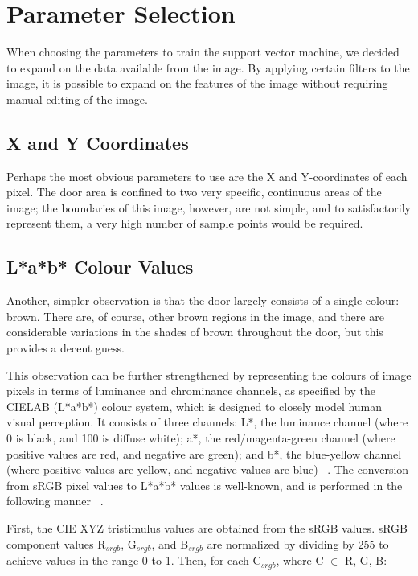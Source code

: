\chapter{Parameter Selection}

When choosing the parameters to train the support vector machine, we decided to expand on the data available from the image. By applying certain filters to the image, it is possible to expand on the features of the image without requiring manual editing of the image.

\section{X and Y Coordinates}
Perhaps the most obvious parameters to use are the X and Y-coordinates of each pixel.  The door area is confined to two very specific, continuous areas of the image; the boundaries of this image, however, are not simple, and to satisfactorily represent them, a very high number of sample points would be required.

\section{L*a*b* Colour Values}
Another, simpler observation is that the door largely consists of a single colour: brown.  There are, of course, other brown regions in the image, and there are considerable variations in the shades of brown throughout the door, but this provides a decent guess.  

This observation can be further strengthened by representing the colours of image pixels in terms of luminance and chrominance channels, as specified by the CIELAB (L*a*b*) colour system, which is designed to closely model human visual perception.  It consists of three channels: L*, the luminance channel (where 0 is black, and 100 is diffuse white); a*, the red/magenta-green channel (where positive values are red, and negative are green); and b*, the blue-yellow channel (where positive values are yellow, and negative values are blue) ~\citep{berns2000billmeyer}. The conversion from sRGB pixel values to L*a*b* values is well-known, and is performed in the following manner ~\citep{mclaren1976xiii}.

First, the CIE XYZ tristimulus values are obtained from the sRGB values. sRGB component values R$_{srgb}$, G$_{srgb}$, and B$_{srgb}$ are normalized by dividing by 255 to achieve values in the range 0 to 1. Then, for each C$_{srgb}$, where C $\in$ R, G, B:

